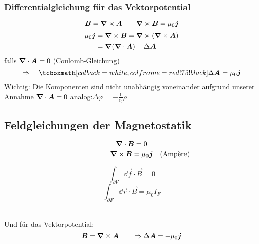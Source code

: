 \subsubsection{Differentialgleichung für das Vektorpotential}

\begin{equation*}
\bm{B} = \bm{\nabla} \times \bm{A} \qquad \bm{\nabla} \times \bm{B} = \mu_0 \bm{j}
\end{equation*}
\begin{align*}
\mu_0 \bm{j} &= \bm{\nabla} \times \bm{B} = \bm{\nabla} \times (\bm{\nabla} \times \bm{A})\\
&= \bm{\nabla}(\bm{\nabla} \cdot \bm{A}) - \Delta \bm{A}
\end{align*}
falls $ \bm{\nabla}\cdot \bm{A} = 0 $ (Coulomb-Gleichung)
\begin{equation*}
\Rightarrow \quad \rmbox{\Delta \vec{A} = \mu_0 \vec{j}}
\end{equation*}
Wichtig: Die Komponenten sind nicht unabhängig voneinander aufgrund unserer Annahme $ \bm{\nabla} \cdot \bm{A} = 0 $
analog:$ \Delta \varphi = - \frac{1}{\epsilon_0} \rho $

\subsection{Feldgleichungen der Magnetostatik}

\begin{minipage}{.5\linewidth}
	\begin{equation*}
	\bm{\nabla} \cdot \bm{B} = 0
	\end{equation*}
	\vspace{-5pt}
	\begin{equation*}
	\phantom{\quad (\tx{Amp\`ere})} \vabla \times \vec{B} = \mu_0 \vec{j} \quad (\tx{Amp\`ere})
	\end{equation*}
\end{minipage}%
\begin{minipage}{.5\linewidth}
	\begin{equation*}
	\int_{\partial V} \dd \vec{f} \cdot \vec{B} = 0
	\end{equation*}
	\begin{equation*}
	\int_{\partial F} \dd \vec{r} \cdot \vec{B} = \mu_0 I_F
	\end{equation*}
\end{minipage}%
\\
Und für das Vektorpotential:
\begin{equation*}
\bm{B} = \bm{\nabla} \times \bm{A} \qquad \Rightarrow \Delta  \bm{A} = - \mu_0 \bm{j}
\end{equation*}

